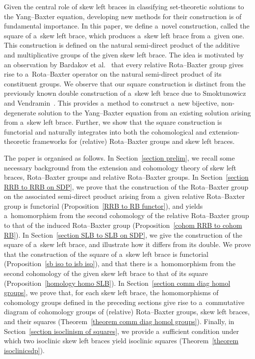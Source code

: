 \documentclass{jonasart}
\theoremstyle{plain}
\begin{document}
	Given the central role of skew left braces in classifying set-theoretic solutions to the Yang--Baxter equation, developing new methods for their construction is of fundamental importance. In this paper, we define a~novel construction, called the square of a~skew left brace, which produces a~skew left brace from a~given one. This construction is defined on the natural semi-direct product of the additive and multiplicative groups of the given skew left brace. The idea is motivated by an observation by Bardakov et al.~\cite{MR4868162} that every relative Rota--Baxter group gives rise to a~Rota--Baxter operator on the natural semi-direct product of its constituent groups. We observe that our square construction is distinct from the previously known double construction of a~skew left brace due to Smoktunowicz and Vendramin~\cite{MR3763907}. This provides a~method to construct a~new bijective, non-degenerate solution to the Yang--Baxter equation from an existing solution arising from a~skew left brace. Further, we show that the square construction is functorial and naturally integrates into both the cohomological and extension-theoretic frameworks for (relative) Rota--Baxter groups and skew left braces.
	
	The paper is organised as follows. In Section~\ref{section prelim}, we recall some necessary background from the extension and cohomology theory of skew left braces, Rota--Baxter groups and relative Rota--Baxter groups. In Section~\ref{section RRB to RRB on SDP}, we prove that the construction of the Rota--Baxter group on the associated semi-direct product arising from a~given relative Rota--Baxter group is functorial (Proposition~\ref{RRB to RB functor}), and yields a~homomorphism from the second cohomology of the relative Rota--Baxter group to that of the induced Rota--Baxter group (Proposition~\ref{cohom RRB to cohom RB}). In Section~\ref{section SLB to SLB on SDP}, we give the construction of the square of a~skew left brace, and illustrate how it differs from its double. We prove that the construction of the square of a~skew left brace is functorial (Proposition~\ref{sb iso to isb iso}), and that there is a~homomorphism from the second cohomology of the given skew left brace to that of its square (Proposition~\ref{homology homo SLB}). In Section~\ref{section comm diag homol groups}, we prove that, for each skew left brace, the homomorphisms of cohomology groups defined in the preceding sections give rise to a~commutative diagram of cohomology groups of (relative) Rota--Baxter groups, skew left braces, and their squares (Theorem~\ref{theorem comm diag homol groups}). Finally, in Section~\ref{section isoclinism of squares}, we provide a~sufficient condition under which two isoclinic skew left braces yield isoclinic squares (Theorem~\ref{theorem isoclinicsdp}).
	
\end{document}
